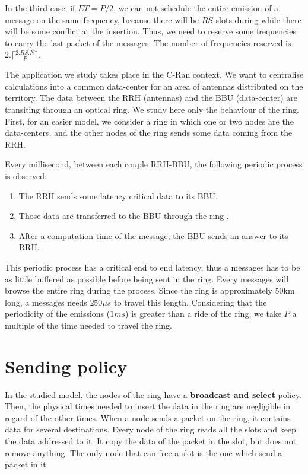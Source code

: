 \documentclass[a4paper,10pt]{article}
\begin{document}
In the third case, if $ET = P/2$, we can not schedule the entire emission of a message on the same frequency, because there will be $RS$ slots during while there will be some conflict at the insertion.
Thus, we need to reserve some frequencies to carry the last packet of the messages.
The number of frequencies reserved is $2 .\lceil \frac{2.RS.N}{P}\rceil$.

	
The application we study takes place in the C-Ran context. We want to centralise calculations into a common data-center for an area of antennas distributed on the territory. The data between the RRH (antennas) and the BBU (data-center) are transiting through an optical ring. We study here only the behaviour of the ring. First, for an easier model, we consider a ring in which one or two nodes are the data-centers, and the other nodes of the ring sends some data coming from the RRH.

Every millisecond, between each couple RRH-BBU, the following periodic process is observed:
\begin{enumerate}
 \item The RRH sends some latency critical data to its BBU.
 \item Those data are transferred to the BBU through the ring .
 \item After a computation time of the message, the BBU sends an answer to its RRH.
\end{enumerate}
 This periodic process has a critical end to end latency, thus a messages has to be as little buffered as possible before being sent in the ring.
 Every messages will browse the entire ring during the process. Since the ring is approximately 50km long, a messages needs $250 \mu s$ to travel this length.
 Considering that the periodicity of the emissions ($1ms$) is greater than a ride of the ring, we take $P$ a multiple of the time needed to travel the ring.
 
 
 
\section*{Sending policy}
In the studied model, the nodes of the ring have a {\bf broadcast and select} policy. Then, the physical times needed to insert the data in the ring are negligible in regard of the other times.
When a node sends a packet on the ring, it contains data for several destinations. Every node of the ring reads all the slots and keep the data addressed to it. It copy the data of the packet in the slot, but does not remove anything. The only node that can free a slot is the one which send a packet in it.
\end{document}
